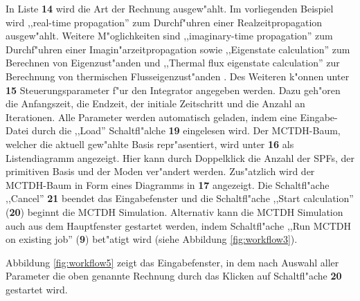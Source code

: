 In Liste \textbf{14} wird die Art der Rechnung ausgew"ahlt. Im vorliegenden Beispiel wird ,,real-time propagation'' 
zum Durchf"uhren einer Realzeitpropagation ausgew"ahlt.
Weite\-re M"oglichkeiten sind ,,imaginary-time propagation'' zum Durchf"uhren einer Imagin"arzeitpropagation 
sowie ,,Eigenstate calculation'' zum Berechnen von Eigenzust"anden und 
,,Thermal flux eigenstate calculation'' zur Berechnung von thermischen Flusseigenzust"anden \cite{thermalflux}.
Des Weiteren k"onnen unter \textbf{15} Steuerungsparameter f"ur den Integrator angegeben werden. Dazu geh"oren die Anfangszeit, die Endzeit,
der initiale Zeitschritt und die Anzahl an Iterationen. 
Alle Parameter werden automatisch geladen, indem eine Eingabe-Datei durch 
die ,,Load'' Schaltfl"alche \textbf{19} eingelesen wird. 
Der MCTDH-Baum, welcher die aktuell gew"ahlte Basis repr"asentiert, wird unter \textbf{16} 
als Listendiagramm angezeigt. Hier
kann durch Doppelklick die Anzahl der SPFs, der primitiven Basis und der Moden ver"andert werden.
Zus"atzlich wird der MCTDH-Baum in Form eines Diagramms in \textbf{17} angezeigt. 
Die Schaltfl"ache ,,Cancel'' \textbf{21} beendet das Eingabefenster
und die Schaltfl"ache ,,Start calculation'' (\textbf{20}) beginnt die MCTDH Simulation.
Alternativ kann die MCTDH Simulation auch aus dem Hauptfenster gestartet werden,
indem Schaltfl"ache ,,Run MCTDH on existing job'' (\textbf{9}) bet"atigt wird (siehe Abbildung \ref{fig:workflow3}).

Abbildung \ref{fig:workflow5} zeigt das Eingabefenster, in dem nach Auswahl aller Parameter die oben genannte Rechnung 
durch das Klicken auf Schaltfl"ache \textbf{20} gestartet wird.

